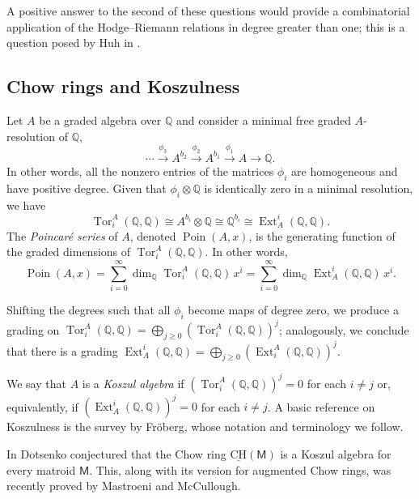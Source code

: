 \documentclass[11pt, a4paper, english]{amsart}
\theoremstyle{teoremas}
\theoremstyle{definition}
\DeclareMathOperator{\Poin}{Poin}
\DeclareMathOperator{\Tor}{Tor}
\DeclareMathOperator{\Ext}{Ext}
\newcommand{\M}{\mathsf{M}}
\newcommand{\uCH}{\underline{\mathrm{CH}}}
\begin{document}
A positive answer to the second of these questions would provide a combinatorial application of the Hodge--Riemann relations in degree greater than one; this is a question posed by Huh in \cite{huh-icm18}.



\subsection{Chow rings and Koszulness}

Let $A$ be a graded algebra over $\mathbb{Q}$ and consider a minimal free graded $A$-resolution of $\mathbb{Q}$,
    \[ \cdots \stackrel{\phi_3}{\longrightarrow} A^{b_2}\stackrel{\phi_2}{\longrightarrow} A^{b_1}\stackrel{\phi_1}{\longrightarrow} A \longrightarrow \mathbb{Q}. \]
In other words, all the nonzero entries of the matrices $\phi_i$ are homogeneous and have positive degree. Given that $\phi_i \otimes \mathbb{Q}$ is identically zero in a minimal resolution, we have
\[ \operatorname{Tor}_i^A(\mathbb{Q},\mathbb{Q}) \cong A^{b_i} \otimes\mathbb{Q} \cong \mathbb{Q}^{b_i} \cong \operatorname{Ext}_A^i(\mathbb{Q},\mathbb{Q}).\]
The \emph{Poincar\'e series} of $A$, denoted $\operatorname{Poin}(A,x)$, is the generating function of the graded dimensions of $\operatorname{Tor}_i^A(\mathbb{Q},\mathbb{Q})$. In other words,
    \[ \Poin(A,x) = \sum_{i=0}^{\infty} \dim_{\mathbb{Q}} \Tor_i^A(\mathbb{Q},\mathbb{Q})\, x^i = \sum_{i=0}^{\infty} \dim_{\mathbb{Q}} \Ext_A^i(\mathbb{Q},\mathbb{Q})\, x^i.\] 

Shifting the degrees such that all $\phi_i$ become maps of degree zero, we produce a grading on $\Tor_i^A(\mathbb{Q},\mathbb{Q}) = \bigoplus_{j\geq 0} \left(\Tor_i^A(\mathbb{Q},\mathbb{Q})\right)^j$; analogously, we conclude that there is a grading $\Ext^i_A(\mathbb{Q},\mathbb{Q}) = \bigoplus_{j\geq 0} \left(\Ext^A_i(\mathbb{Q},\mathbb{Q})\right)^j$.

We say that $A$ is a \emph{Koszul algebra} if $\left(\Tor_i^A(\mathbb{Q},\mathbb{Q})\right)^{j} = 0$ for each $i\neq j$ or, equivalently, if $\left(\Ext^i_A(\mathbb{Q},\mathbb{Q})\right)^{j} = 0$ for each $i\neq j$. A basic reference on Koszulness is the survey \cite{froberg} by Fr\"oberg, whose notation and terminology we follow.

In \cite[Conjecture~2]{dotsenko} Dotsenko conjectured that the Chow ring $\uCH(\M)$ is a Koszul algebra for every matroid $\M$. This, along with its version for augmented Chow rings, was recently proved by Mastroeni and McCullough.
\end{document}
